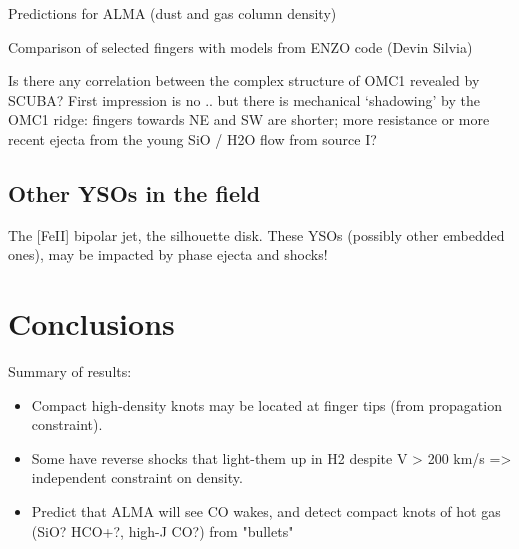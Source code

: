 \documentclass[12pt,preprint]{aastex}
\begin{document}
Predictions for ALMA (dust and gas column density)

Comparison of selected fingers with models from ENZO code 
(Devin Silvia) 

Is there any correlation between the complex structure of OMC1 revealed by
SCUBA?  First impression is no .. but there is mechanical `shadowing' by the
OMC1 ridge: fingers towards NE and SW are shorter; more resistance or more
recent ejecta from the young SiO / H2O flow from source I?

\subsection{Other YSOs in the field}

The [FeII] bipolar jet, the silhouette disk.
These YSOs (possibly other embedded ones), may be 
impacted by phase ejecta and shocks! 

\section{Conclusions}

Summary of results:

\begin{itemize}

\item Compact high-density knots may be located at
finger tips (from propagation constraint).

\item Some have reverse shocks that light-them up in H2 despite
V > 200 km/s => independent constraint on density.

\item Predict that ALMA will see CO wakes, and detect 
compact knots of hot gas (SiO? HCO+?, high-J CO?)
from "bullets"
\end{itemize}









\end{document}
